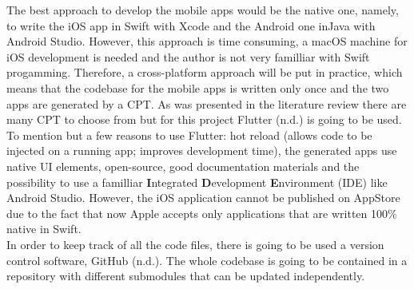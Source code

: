 \documentclass[version=last,fontsize=13pt]{scrartcl}
\begin{document}
	The best approach to develop the mobile apps would be the native one, namely, to write the iOS app in Swift with Xcode and the Android one inJava with Android Studio. However, this approach is time consuming, a macOS machine for iOS development is needed and the author is not very familliar with Swift progamming. Therefore, a cross-platform approach will be put in practice, which means that the codebase for the mobile apps is written only once and the two apps are generated by a CPT. As was presented in the literature review there are many CPT to choose from but for this project Flutter (n.d.) is going to be used. To mention but a few reasons to use Flutter: hot reload (allows code to be injected on a running app; improves development time), the generated apps use native UI elements, open-source, good documentation materials and the possibility to use a familliar \textbf{I}ntegrated \textbf{D}evelopment \textbf{E}nvironment (IDE) like Android Studio. However, the iOS application cannot be published on AppStore due to the fact that now Apple accepts only applications that are written 100\% native in Swift.\\
	\indent
	In order to keep track of all the code files, there is going to  be used a version control software, GitHub (n.d.). The whole codebase is going to be contained in a repository with different submodules that can be updated independently. 
	

\end{document}
